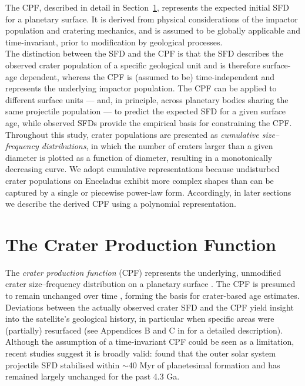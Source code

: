 \documentclass[preprint,11pt,3p,times,authoryear]{elsarticle}
\begin{document}
The CPF, described in detail in Section~\ref{sub:intro_cpf}, represents the expected initial SFD for a planetary surface. It is derived from physical considerations of the impactor population and cratering mechanics, and is assumed to be globally applicable and time-invariant, prior to modification by geological processes. \\

The distinction between the SFD and the CPF is that the SFD describes the observed crater population of a specific geological unit and is therefore surface-age dependent, whereas the CPF is (assumed to be) time-independent and represents the underlying impactor population. The CPF can be applied to different surface units --- and, in principle, across planetary bodies sharing the same projectile population --- to predict the expected SFD for a given surface age, while observed SFDs provide the empirical basis for constraining the CPF.\\

Throughout this study, crater populations are presented as \textit{cumulative size–frequency distributions}, in which the number of craters larger than a given diameter is plotted as a function of diameter, resulting in a monotonically decreasing curve. We adopt cumulative representations because undisturbed crater populations on Enceladus exhibit more complex shapes than can be captured by a single or piecewise power-law form. Accordingly, in later sections we describe the derived CPF using a polynomial representation. \\

\section{The Crater Production Function}
\label{sub:intro_cpf}
The \textit{crater production function} (CPF) represents the underlying, unmodified crater size–frequency distribution on a planetary surface \citep{Neukum1975}. The CPF is presumed to remain unchanged over time \citep{Neukum1975,Neukum1983,Werner2014,Werner2023}, forming the basis for crater-based age estimates. Deviations between the actually observed crater SFD and the CPF yield insight into the satellite's geological history, in particular when specific areas were (partially) resurfaced (see Appendices B and C in \citet{Werner2009} for a detailed description).
Although the assumption of a time-invariant CPF could be seen as a limitation, recent studies suggest it is broadly valid: \citet{Bottke2024} found that the outer solar system projectile SFD stabilised within $\sim$40 Myr of planetesimal formation and has remained largely unchanged for the past 4.3 Ga. \\
\end{document}
